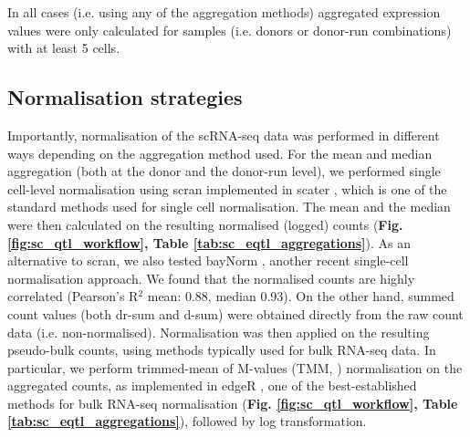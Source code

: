 
In all cases (i.e. using any of the aggregation methods) aggregated expression values were only calculated for samples (i.e. donors or donor-run combinations) with at least 5 cells.

\newpage

\subsection{Normalisation strategies}

Importantly, normalisation of the scRNA-seq data was performed in different ways depending on the aggregation method used. 
For the mean and median aggregation (both at the donor and the donor-run level), we performed single cell-level normalisation using scran \cite{lun2016pooling} implemented in scater \cite{mccarthy2017scater}, which is one of the standard methods used for single cell normalisation. 
The mean and the median were then calculated on the resulting normalised (logged) counts (\textbf{Fig. \ref{fig:sc_qtl_workflow}, Table \ref{tab:sc_eqtl_aggregations}}). 
As an alternative to scran, we also tested bayNorm \cite{tang2020baynorm}, another recent single-cell normalisation approach. 
We found that the normalised counts are highly correlated (Pearson's R$^2$ mean: 0.88, median 0.93). 
On the other hand, summed count values (both dr-sum and d-sum) were obtained directly from the raw count data (i.e. non-normalised). 
Normalisation was then applied on the resulting pseudo-bulk counts, using methods typically used for bulk RNA-seq data.
In particular, we perform trimmed-mean of M-values (TMM, \cite{robinson2010scaling}) normalisation on the aggregated counts, as implemented in edgeR \cite{robinson2010edger}, one of the best-established methods for bulk RNA-seq normalisation (\textbf{Fig. \ref{fig:sc_qtl_workflow}, Table \ref{tab:sc_eqtl_aggregations}}), followed by log transformation.


